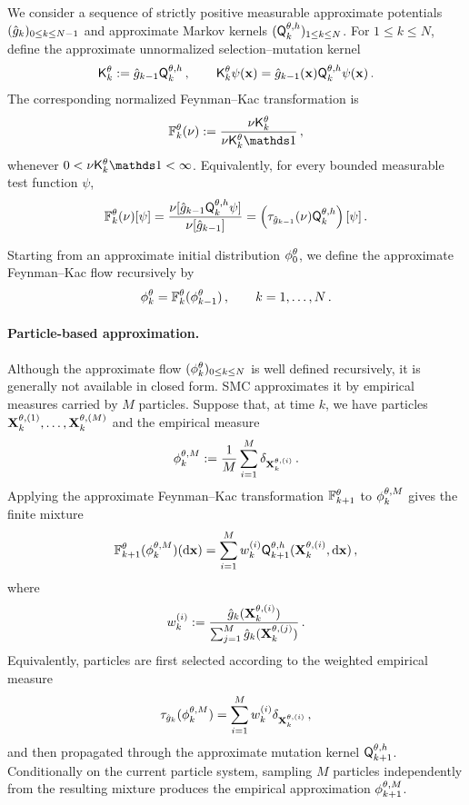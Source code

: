\documentclass[11pt]{article}
\theoremstyle{plain}
\theoremstyle{definition}
\theoremstyle{remark}
\begin{document}
We consider a sequence of strictly positive measurable approximate potentials $(\approxpot{k})_{0\le k\le N-1}$ and approximate Markov kernels $(\mk{k}[\theta,h])_{1\le k\le N}$. For $1\le k\le N$, define the approximate unnormalized
selection--mutation kernel
\begin{align}
\label{eq:fk_kernel_approx}
\unpredictive{k}[\theta] \eqdef \approxpot{k-1}\mk{k}[\theta,h] \eqsp,
\qquad \unpredictive{k}[\theta]\psi(\x) = \approxpot{k-1}(\x) \mk{k}[\theta,h]\psi(\x) \eqsp.
\end{align}
%
The corresponding normalized Feynman--Kac transformation is
\begin{equation}
\label{eq:filter_recursion_approx}
\filtertransform{k}[\theta](\nu) \eqdef \frac{\nu\unpredictive{k}[\theta]}{\nu\unpredictive{k}[\theta]\un} \eqsp,
\end{equation}
whenever
$0<\nu\unpredictive{k}[\theta]\un<\infty$.
Equivalently, for every bounded measurable test function $\psi$,
$$
\filtertransform{k}[\theta](\nu)[\psi]
= \frac{ \nu[ \approxpot{k-1}\mk{k}[\theta,h]\psi ] }{ \nu[\approxpot{k-1}] }
= \left( \tau_{\approxpot{k-1}}(\nu) \mk{k}[\theta,h] \right)[\psi] \eqsp.
$$

Starting from an approximate initial distribution
$\approxfilter{0}$, we define the approximate Feynman--Kac flow
recursively by
$$
\approxfilter{k}
= \filtertransform{k}[\theta](\approxfilter{k-1}) \eqsp, \qquad k = 1,\ldots,N \eqsp.
$$

\paragraph{Particle-based approximation.}

Although the approximate flow
$(\approxfilter{k})_{0\le k\le N}$ is well defined recursively, it is
generally not available in closed form. SMC approximates it by empirical
measures carried by $M$ particles. Suppose that, at time $k$, we have
particles $\mathbf{X}_k^{\theta,(1)},\ldots,\mathbf{X}_k^{\theta,(M)}$ and the empirical measure
$$
\mcfilter{k} \eqdef \frac{1}{M} \sum_{i=1}^{M} \delta_{\X_k^{\theta,(i)}} \eqsp.
$$
%
Applying the approximate Feynman--Kac transformation
$\filtertransform{k+1}[\theta]$ to $\mcfilter{k}$ gives the finite mixture
$$
\filtertransform{k+1}[\theta](\mcfilter{k})(\rmd\x)
= \sum_{i=1}^{M} w_k^{(i)} \mk{k+1}[\theta,h] (\X_k^{\theta,(i)},\rmd\x) \eqsp,
$$
where
$$
w_k^{(i)} \eqdef \frac{ \approxpot{k}(\X_k^{\theta,(i)}) }{ \sum_{j=1}^{M} \approxpot{k}(\X_k^{\theta,(j)}) } \eqsp.
$$
%
Equivalently, particles are first selected according to the weighted
empirical measure
$$
\tau_{\approxpot{k}}(\mcfilter{k})
= \sum_{i=1}^{M} w_k^{(i)} \delta_{\X_k^{\theta,(i)}} \eqsp,
$$
and then propagated through the approximate mutation kernel $\mk{k+1}[\theta,h]$. Conditionally on the current particle system, sampling $M$ particles independently from the resulting mixture produces the empirical approximation $\mcfilter{k+1}$. 
\end{document}
